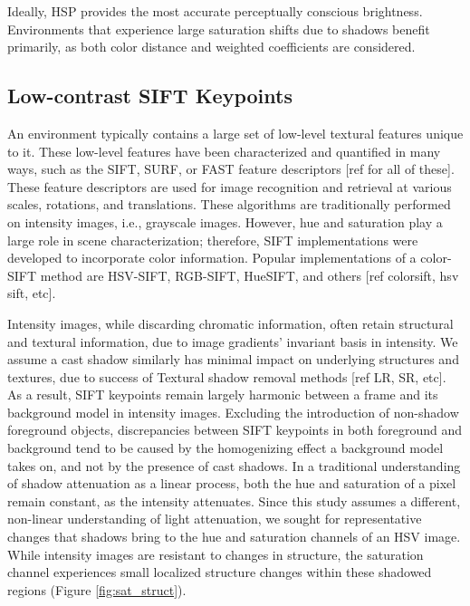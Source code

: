 \documentclass[12pt]{report}
\begin{document}
Ideally, HSP provides the most accurate perceptually conscious brightness. Environments that experience large saturation shifts due to shadows benefit primarily, as both color distance and weighted coefficients are considered.

\subsection{Low-contrast SIFT Keypoints} \label{lowcSIFT}

An environment typically contains a large set of low-level textural features unique to it. These low-level features have been characterized and quantified in many ways, such as the SIFT, SURF, or FAST feature descriptors [ref for all of these]. These feature descriptors are used for image recognition and retrieval at various scales, rotations, and translations. These algorithms are traditionally performed on intensity images, i.e., grayscale images. However, hue and saturation play a large role in scene characterization; therefore, SIFT implementations were developed to incorporate color information. Popular implementations of a color-SIFT method are HSV-SIFT, RGB-SIFT, HueSIFT, and others [ref colorsift, hsv sift, etc].

Intensity images, while discarding chromatic information, often retain structural and textural information, due to image gradients' invariant basis in intensity. We assume a cast shadow similarly has minimal impact on underlying structures and textures, due to success of Textural shadow removal methods [ref LR, SR, etc]. As a result, SIFT keypoints remain largely harmonic between a frame and its background model in intensity images. Excluding the introduction of non-shadow foreground objects, discrepancies between SIFT keypoints in both foreground and background tend to be caused by the homogenizing effect a background model takes on, and not by the presence of cast shadows. In a traditional understanding of shadow attenuation as a linear process, both the hue and saturation of a pixel remain constant, as the intensity attenuates. Since this study assumes a different, non-linear understanding of light attenuation, we sought for representative changes that shadows bring to the hue and saturation channels of an HSV image. While intensity images are resistant to changes in structure, the saturation channel experiences small localized structure changes within these shadowed regions (Figure \ref{fig:sat_struct}).
\end{document}
